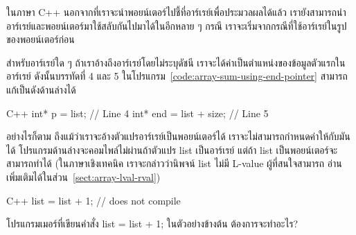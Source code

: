 ใน{\wbr}ภาษา C++ นอกจาก{\wbr}ที่{\wbr}เรา{\wbr}จะ{\wbr}นำ{\wbr}พอยน์เตอร์{\wbr}ไป{\wbr}ชี้{\wbr}ที่{\wbr}อาร์เรย์{\wbr}เพื่อ{\wbr}ประมวลผล{\wbr}ได้{\wbr}แล้ว{\wbr}
เรา{\wbr}ยัง{\wbr}สามารถ{\wbr}นำ{\wbr}อาร์เรย์{\wbr}และ{\wbr}พอยน์เตอร์{\wbr}มา{\wbr}ใช้{\wbr}สลับ{\wbr}กัน{\wbr}ไป{\wbr}มา{\wbr}ได้{\wbr}ใน{\wbr}อีก{\wbr}หลาย ๆ กรณี{\wbr}
เรา{\wbr}จะ{\wbr}เริ่ม{\wbr}จาก{\wbr}กรณี{\wbr}ที่{\wbr}ใช้{\wbr}อาร์เรย์{\wbr}ใน{\wbr}รูป{\wbr}ของ{\wbr}พอยน์เตอร์{\wbr}ก่อน{\wbr}

สำหรับ{\wbr}อาร์เรย์{\wbr}ใด ๆ ถ้า{\wbr}เรา{\wbr}อ้าง{\wbr}ถึง{\wbr}อาร์เรย์{\wbr}โดย{\wbr}ไม่{\wbr}ระบุ{\wbr}ดัชนี{\wbr}
เรา{\wbr}จะ{\wbr}ได้{\wbr}ค่า{\wbr}เป็น{\wbr}ตำแหน่ง{\wbr}ของ{\wbr}ข้อมูล{\wbr}ตัว{\wbr}แรก{\wbr}ใน{\wbr}อาร์เรย์ ดังนั้น{\wbr}บรรทัด{\wbr}ที่ 4 และ 5
ใน{\wbr}โปรแกรม~\ref{code:array-sum-using-end-pointer} สามารถ{\wbr}แก้{\wbr}เป็น{\wbr}ดัง{\wbr}ด้าน{\wbr}ล่าง{\wbr}ได้{\wbr}

\latintext
\begin{codelist}{C++}{}
  int* p = list;                 // Line 4
  int* end = list + size;        // Line 5
\end{codelist}
\thaitext

อย่างไรก็ตาม ถึงแม้ว่า{\wbr}เรา{\wbr}จะ{\wbr}อ้าง{\wbr}ตัวแปร{\wbr}อาร์เรย์{\wbr}เป็น{\wbr}พอยน์เตอร์{\wbr}ได้{\wbr}
เรา{\wbr}จะ{\wbr}ไม่{\wbr}สามารถ{\wbr}กำหนด{\wbr}ค่า{\wbr}ให้{\wbr}กับ{\wbr}มัน{\wbr}ได้ โปรแกรม{\wbr}ด้าน{\wbr}ล่าง{\wbr}จะ{\wbr}คอมไพล์{\wbr}ไม่{\wbr}ผ่าน{\wbr}ถ้า{\wbr}ตัวแปร {\ct
  list} เป็น{\wbr}อาร์เรย์ แต่{\wbr}ถ้า {\ct list} เป็น{\wbr}พอยน์เตอร์{\wbr}จะ{\wbr}สามารถ{\wbr}ทำ{\wbr}ได้{\wbr}
(ใน{\wbr}ภาษา{\wbr}เชิง{\wbr}เทคนิค เรา{\wbr}จะ{\wbr}กล่าว{\wbr}ว่า{\wbr}นิพจน์ {\ct list} ไม่{\wbr}มี L-value ผู้{\wbr}ที่{\wbr}สนใจ{\wbr}สามารถ{\wbr}
อ่าน{\wbr}เพิ่มเติม{\wbr}ได้{\wbr}ใน{\wbr}ส่วน~\ref{sect:array-lval-rval})

\latintext
\begin{codelist}{C++}{}
  list = list + 1;              // does not compile
\end{codelist}
\thaitext

\begin{quiz}{}
โปรแกรมเมอร์{\wbr}ที่{\wbr}เขียน{\wbr}คำสั่ง {\ct list = list + 1; }  ใน{\wbr}ตัวอย่าง{\wbr}ข้างต้น ต้องการ{\wbr}จะ{\wbr}ทำ{\wbr}อะไร?
\end{quiz}

